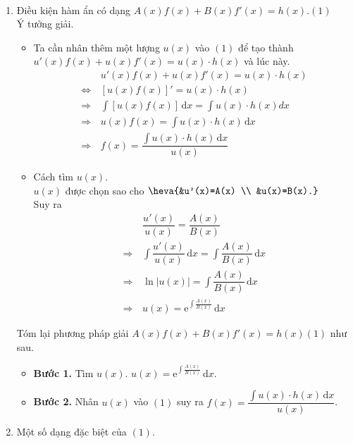 \begin{dang}{~}
	\begin{enumerate}[1]
		\item Điều kiện hàm ẩn có dạng $A(x)f(x)+B(x)f'(x)=h(x)$.\quad $(1)$\\
		Ý tưởng giải.
		\begin{itemize}
			\item Ta cần nhân thêm một lượng $u(x)$ vào  $(1)$ để tạo thành  $u'(x) f(x)+u(x) f'(x)=u(x) \cdot h(x)$ và lúc này.
			\begin{align*}
				&\, u'(x) f(x)+u(x) f'(x)=u(x) \cdot h(x) \\
				\Leftrightarrow&\,\left[u(x) f(x)\right]'=u(x) \cdot h(x) \\
				\Rightarrow&\, \displaystyle\int\left[u(x) f(x)\right] \mathrm{\,d} x=\displaystyle\int u(x) \cdot h(x) d x \\
				\Rightarrow&\, u(x) f(x)=\displaystyle\int u(x) \cdot h(x) \mathrm{\,d} x \\
				\Rightarrow&\, f(x)=\dfrac{\displaystyle\int u(x) \cdot h(x) \mathrm{\,d} x}{u(x)}
			\end{align*}
			\item Cách tìm $u(x)$.\\
			$u(x)$ được chọn sao cho  $\heva{&u'(x)=A(x) \\ &u(x)=B(x).}$\\
			Suy ra 
			\begin{align*}
				&\,\dfrac{u'(x)}{u(x)}=\dfrac{A(x)}{B(x)}\\
				\Rightarrow&\, \displaystyle\int \dfrac{u'(x)}{u(x)} \mathrm{\,d} x=\displaystyle\int \dfrac{A(x)}{B(x)} \mathrm{\,d} x\\
				\Rightarrow&\, \ln |u(x)|=\displaystyle\int \dfrac{A(x)}{B(x)} \mathrm{\,d} x\\
				\Rightarrow&\, u(x)=\mathrm{e}^{\displaystyle\int\tfrac{A(x)}{B(x)}} \mathrm{\,d} x
			\end{align*}
		\end{itemize}
		Tóm lại phương pháp giải $A(x)f(x)+B(x)f'(x)=h(x)$\quad $(1)$ như sau.
		\begin{itemize}
			\item \textbf{Bước 1.} Tìm $u(x)$. $u(x)=\mathrm{e}^{\displaystyle\int\tfrac{A(x)}{B(x)}} \mathrm{\,d} x$.
			\item \textbf{Bước 2.} Nhân $u(x)$ vào $(1)$ suy ra $f(x)=\dfrac{\displaystyle\int\limits u(x) \cdot h(x) \mathrm{\,d}x}{u(x)}$.
		\end{itemize}
		\item Một số dạng đặc biệt của $(1)$.

\end{enumerate}
\end{dang}
